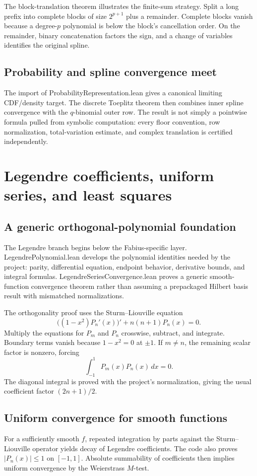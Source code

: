 \documentclass[11pt,a4paper,openany]{book}
\def\module#1{#1.lean}
\newcommand{\module}[1]{\nolinkurl{#1.lean}}
\begin{document}
The block-translation theorem illustrates the finite-sum strategy.  Split a
long prefix into complete blocks of size $2^{p+1}$ plus a remainder.  Complete
blocks vanish because a degree-$p$ polynomial is below the block's cancellation
order.  On the remainder, binary concatenation factors the sign, and a change
of variables identifies the original spline.

\section{Probability and spline convergence meet}
The import of \module{ProbabilityRepresentation} gives a canonical limiting
CDF/density target.  The discrete Toeplitz theorem then combines inner spline
convergence with the $q$-binomial outer row.  The result is not simply a
pointwise formula pulled from symbolic computation: every floor convention,
row normalization, total-variation estimate, and complex translation is
certified independently.

\chapter{Legendre coefficients, uniform series, and least squares}
\label{ch:legendre}

\section{A generic orthogonal-polynomial foundation}
The Legendre branch begins below the Fabius-specific layer.
\module{LegendrePolynomial} develops the polynomial identities needed by the
project: parity, differential equation, endpoint behavior, derivative bounds,
and integral formulas.  \module{LegendreSeriesConvergence} proves a generic
smooth-function convergence theorem rather than assuming a prepackaged Hilbert
basis result with mismatched normalizations.

The orthogonality proof uses the Sturm--Liouville equation
\[
 \bigl((1-x^2)P_n'(x)\bigr)'+n(n+1)P_n(x)=0.
\]
Multiply the equations for $P_m$ and $P_n$ crosswise, subtract, and integrate.
Boundary terms vanish because $1-x^2=0$ at $\pm1$.  If $m\ne n$, the remaining
scalar factor is nonzero, forcing
\[
 \int_{-1}^{1}P_m(x)P_n(x)\,dx=0.
\]
The diagonal integral is proved with the project's normalization, giving the
usual coefficient factor $(2n+1)/2$.

\section{Uniform convergence for smooth functions}
For a sufficiently smooth $f$, repeated integration by parts against the
Sturm--Liouville operator yields decay of Legendre coefficients.  The code also
proves $|P_n(x)|\le1$ on $[-1,1]$.  Absolute summability of coefficients then
implies uniform convergence by the Weierstrass $M$-test.
\end{document}
